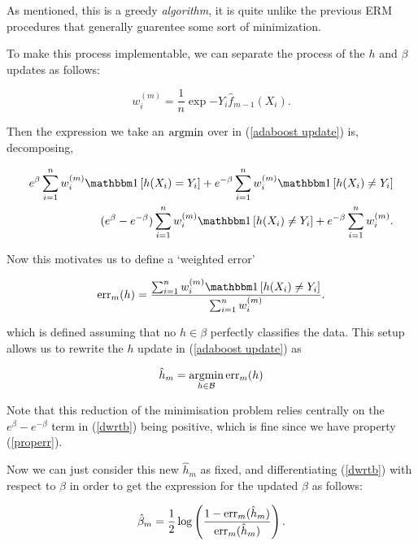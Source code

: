 \documentclass[11pt]{scrartcl}
\begin{document}
\begin{remark}
As mentioned, this is a greedy \textit{algorithm}, it is quite unlike the previous ERM procedures that generally guarentee some sort of minimization.
\end{remark}

To make this process implementable, we can separate the process of the $h$ and $\beta$ updates as follows:

\begin{equation}
    w_i^{(m)} = \frac1n \exp{ -Y_i \hat{f}_{m-1}(X_i) }.
\end{equation}

Then the expression we take an $\operatorname*{arg min}$ over in (\ref{adaboost update}) is, decomposing,

\begin{align}
    e^\beta \sum_{i=1}^n w_i^{(m)} \one{ h(X_i) = Y_i } + e^{-\beta} \sum_{i=1}^n w_i^{(m)} \one{h(X_i) \neq Y_i} \\
    (e^\beta - e^{-\beta}) \sum_{i=1}^n w_i^{(m)} \one{h(X_i) \neq Y_i} +  e^{-\beta} \sum_{i=1}^n w_i^{(m)}.
\label{dwrtb}
\end{align}

Now this motivates us to define a `weighted error'

\begin{equation}
    \err_m(h) = \frac{\sum_{i=1}^n w_i^{(m)} \one{h(X_i) \neq Y_i}}{\sum_{i=1}^n w_i^{(m)}}.
\label{errdef}
\end{equation}

which is defined assuming that no $h \in \beta$ perfectly classifies the data. This setup allows us to rewrite the $h$ update in (\ref{adaboost update}) as

\begin{equation}
   \hat{h}_m = \operatorname*{arg min}_{h \in \mathcal{B}} \text{err}_m(h)
\end{equation}

Note that this reduction of the minimisation problem relies centrally on the $e^{\beta} - e^{-\beta}$ term in (\ref{dwrtb}) being positive, which is fine since we have property (\ref{properr}).

Now we can just consider this new $ \hat{h}_m$ as fixed, and differentiating (\ref{dwrtb}) with respect to $\beta$ in order to get the expression for the updated $\beta$ as follows:

\begin{equation}
    \hat{\beta}_m = \frac12 \log \left( \frac{1 - \text{err}_m(\hat{h}_m)}{\text{err}_m(\hat{h}_m)} \right).
\end{equation}
\end{document}
